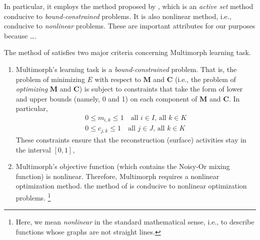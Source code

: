In particular, it employs the method proposed by
\citet{cheng-and-li:2012}, which is an \emph{active set} method conducive to 
\emph{bound-constrained} problems. It is also nonlinear method, i.e., conducive to \emph{nonlinear} problems. 
These are important attributes for our purposes because \dots.

The method of \citet{cheng-and-li:2012} satisfies two major criteria concerning Multimorph
 learning task.
\begin{enumerate} 
\item Multimorph's learning task is a \emph{bound-constrained} problem. That is,
the problem of minimizing $E$ with respect to $\mathbf{M}$ and $\mathbf{C}$ (i.e., the problem of \emph{optimizing}  $\mathbf{M}$ and $\mathbf{C}$) is subject to constraints that take the form of 
lower and upper bounds (namely, 0 and 1) on each component of $\mathbf{M}$ and $\mathbf{C}$. In particular,
\begin{align}%
\label{eq:bounds-m}
0 \le m_{i,k} \le 1 \quad \text{all $i \in I$, all $k \in K$} \\
\label{eq:bounds-c}
0 \le c_{j,k} \le 1 \quad \text{all $j \in J$, all $k \in K$}
\end{align}
These constraints ensure that the reconstruction (surface) activities stay in the interval $[0,1]$,
\item Multimorph's objective function (which contains the Noisy-Or mixing function) is nonlinear. Therefore, Multimorph requires a nonlinear optimization method. the method of \citet{cheng-and-li:2012} is conducive to nonlinear optimization problems. \footnote{Here, we mean \emph{nonlinear} in the standard mathematical sense, i.e., to describe functions whose graphs are not straight lines.} %
\end{enumerate}

